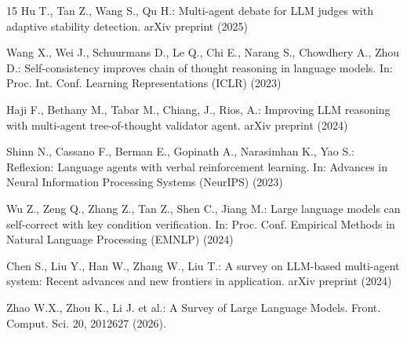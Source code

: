 \documentclass{llncs}
\begin{document}
\begin{thebibliography}{15}
 Hu T., Tan Z., Wang S., Qu H.: Multi-agent debate for LLM judges with adaptive stability detection. arXiv preprint (2025)

 Wang X., Wei J., Schuurmans D., Le Q., Chi E., Narang S., Chowdhery A., Zhou D.: Self-consistency improves chain of thought reasoning in language models. In: Proc. Int. Conf. Learning Representations (ICLR) (2023)


 Haji F., Bethany M., Tabar M., Chiang,  J., Rios,  A.: Improving LLM reasoning with multi-agent tree-of-thought validator agent. arXiv preprint (2024)

 Shinn N., Cassano F., Berman E., Gopinath A., Narasimhan K., Yao S.: Reflexion: Language agents with verbal reinforcement learning. In: Advances in Neural Information Processing Systems (NeurIPS) (2023)

 Wu Z., Zeng Q., Zhang Z., Tan Z., Shen C., Jiang M.: Large language models can self-correct with key condition verification. In: Proc. Conf. Empirical Methods in Natural Language Processing (EMNLP) (2024)


 Chen S., Liu Y., Han W., Zhang W., Liu T.: A survey on LLM-based multi-agent system: Recent advances and new frontiers in application. arXiv preprint (2024)

 Zhao W.X., Zhou K., Li J. et al.: A Survey of Large Language Models. Front. Comput. Sci. 20, 2012627 (2026).



\end{thebibliography}
\end{document}
